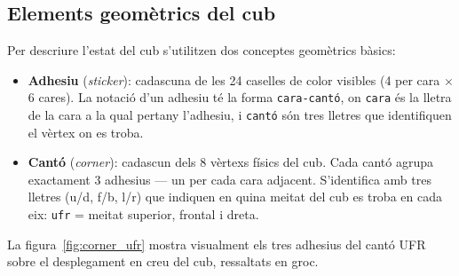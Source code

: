 \documentclass[12pt, a4paper]{article}
\begin{document}
\subsection{Elements geomètrics del cub}

Per descriure l'estat del cub s'utilitzen dos conceptes geomètrics bàsics:

\begin{itemize}
  \item \textbf{Adhesiu} (\textit{sticker}): cadascuna de les 24 caselles de color visibles (4 per cara $\times$ 6 cares). La notació d'un adhesiu té la forma \texttt{cara-cantó}, on \texttt{cara} és la lletra de la cara a la qual pertany l'adhesiu, i \texttt{cantó} són tres lletres que identifiquen el vèrtex on es troba.

  \item \textbf{Cantó} (\textit{corner}): cadascun dels 8 vèrtexs físics del cub. Cada cantó agrupa exactament 3 adhesius — un per cada cara adjacent. S'identifica amb tres lletres (u/d, f/b, l/r) que indiquen en quina meitat del cub es troba en cada eix: \texttt{ufr} = meitat superior, frontal i dreta.
\end{itemize}


La figura~\ref{fig:corner_ufr} mostra visualment els tres adhesius del cantó UFR sobre el desplegament en creu del cub, ressaltats en groc.
\end{document}
